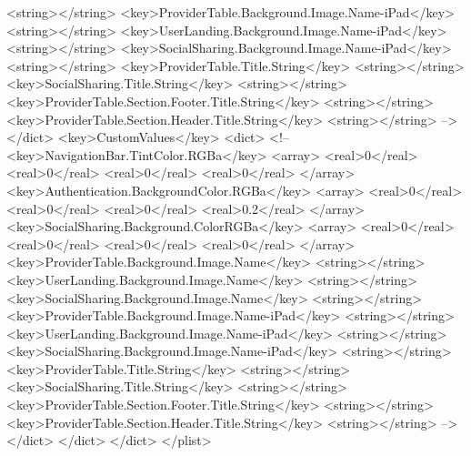 \begin{DoxyCodeInclude}
                        <string></string>
                        <key>ProviderTable.Background.Image.Name-iPad</key>
                        <string></string>
                        <key>UserLanding.Background.Image.Name-iPad</key>
                        <string></string>
                        <key>SocialSharing.Background.Image.Name-iPad</key>
                        <string></string>
                        <key>ProviderTable.Title.String</key>
                        <string></string>
                        <key>SocialSharing.Title.String</key>
                        <string></string>
                        <key>ProviderTable.Section.Footer.Title.String</key>
                        <string></string>
                        <key>ProviderTable.Section.Header.Title.String</key>
                        <string></string>
-->
                </dict>
                <key>CustomValues</key>
                <dict>
<!--
                        <key>NavigationBar.TintColor.RGBa</key>
                        <array>
                                <real>0</real>
                                <real>0</real>
                                <real>0</real>
                                <real>0</real>
                        </array>
                        <key>Authentication.BackgroundColor.RGBa</key>
                        <array>
                                <real>0</real>
                                <real>0</real>
                                <real>0</real>
                                <real>0.2</real>
                        </array>
                        <key>SocialSharing.Background.ColorRGBa</key>
                                <array>
                                        <real>0</real>
                                        <real>0</real>
                                        <real>0</real>
                                        <real>0</real>
                                </array>
                        <key>ProviderTable.Background.Image.Name</key>
                        <string></string>
                        <key>UserLanding.Background.Image.Name</key>
                        <string></string>
                        <key>SocialSharing.Background.Image.Name</key>
                        <string></string>
                        <key>ProviderTable.Background.Image.Name-iPad</key>
                        <string></string>
                        <key>UserLanding.Background.Image.Name-iPad</key>
                        <string></string>
                        <key>SocialSharing.Background.Image.Name-iPad</key>
                        <string></string>
                        <key>ProviderTable.Title.String</key>
                        <string></string>
                        <key>SocialSharing.Title.String</key>
                        <string></string>
                        <key>ProviderTable.Section.Footer.Title.String</key>
                        <string></string>
                        <key>ProviderTable.Section.Header.Title.String</key>
                        <string></string> 
-->
                </dict>
        </dict>
</dict>
</plist>



\end{DoxyCodeInclude}
 